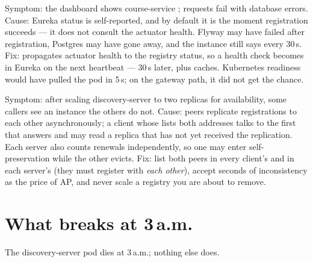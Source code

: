 \begin{pitfall}
Symptom: the dashboard shows course-service ; requests fail
with database errors. Cause: Eureka status is self-reported, and by
default it is  the moment registration succeeds --- it does not
consult the actuator health. Flyway may have failed after registration,
Postgres may have gone away, and the instance still says 
every 30\,s. Fix: 
propagates actuator health to the registry status, so a 
health check becomes  in Eureka on the next heartbeat --- 30\,s
later, plus caches. Kubernetes readiness would have pulled the pod in
5\,s; on the gateway path, it did not get the chance.
\end{pitfall}

\begin{pitfall}
Symptom: after scaling discovery-server to two replicas for
availability, some callers see an instance the others do not. Cause:
peers replicate registrations to each other asynchronously; a client
whose  lists both addresses talks to the first that
answers and may read a replica that has not yet received the
replication. Each server also counts renewals independently, so one may
enter self-preservation while the other evicts. Fix: list both peers in
every client's  and in each server's
 (they must register with \emph{each other}), accept
seconds of inconsistency as the price of AP, and never scale a registry
you are about to remove.
\end{pitfall}

\section{What breaks at 3\,a.m.}

The discovery-server pod dies at 3\,a.m.; nothing else does.

